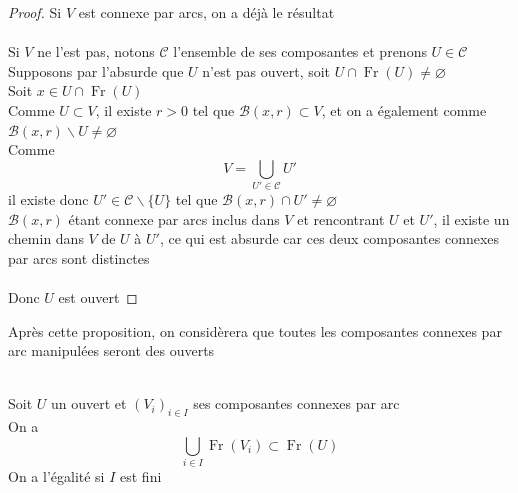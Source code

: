\documentclass{article}
\begin{document}
\begin{flushleft}
\begin{proof}
    Si $V$ est connexe par arcs, on a déjà le résultat
    \\~\\
    Si $V$ ne l'est pas, notons $\mathcal{C}$ l'ensemble de ses composantes et prenons $U \in \mathcal{C}$\\
    Supposons par l'absurde que $U$ n'est pas ouvert, soit $U \cap \operatorname{Fr}(U) \neq \varnothing$\\
    Soit $x \in U \cap \operatorname{Fr}(U)$\\
    Comme $U \subset V$, il existe $r > 0$ tel que $\mathcal{B}(x, r) \subset V$, et on a également comme
    $\mathcal{B}(x, r) \backslash U \neq \varnothing$\\
    Comme
    \[ V = \bigcup_{U' \in \mathcal{C}} U' \]
    il existe donc $U' \in \mathcal{C} \backslash \{U \}$ tel que $\mathcal{B}(x, r) \cap U' \neq \varnothing$\\
    $\mathcal{B}(x, r)$ étant connexe par arcs inclus dans $V$ et rencontrant $U$ et $U'$, il existe un chemin dans
    $V$ de $U$ à $U'$, ce qui est absurde car ces deux composantes connexes par arcs sont distinctes
    \\~\\
    Donc $U$ est ouvert
\end{proof}
\vspace*{0.5cm}

Après cette proposition, on considèrera que toutes les composantes connexes par arc manipulées seront des ouverts
\\~\\
\begin{tcolorbox}[colback = purple!20!white, colframe = purple!60!white, title = Proposition 3]
    Soit $U$ un ouvert et $(V_i)_{i \in I}$ ses composantes connexes par arc\\
    On a
    \[ \bigcup_{i \in I} \operatorname{Fr}(V_i) \subset \operatorname{Fr}(U) \]
    On a l'égalité si $I$ est fini
\end{tcolorbox}


\end{flushleft}
\end{document}
